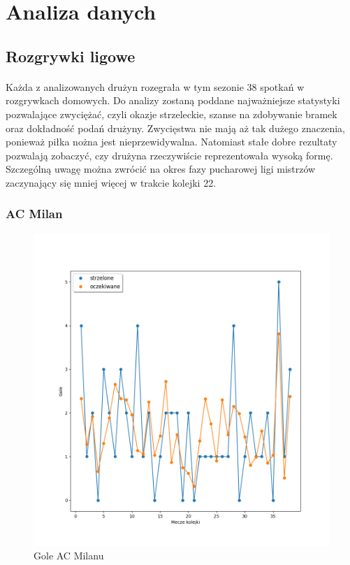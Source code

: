\documentclass[12pt, letterpaper]{article}
\begin{document}
\section{Analiza danych}
\subsection{Rozgrywki ligowe}
\paragraph{} Każda z analizowanych drużyn rozegrała w tym sezonie 38 spotkań w rozgrywkach domowych. Do analizy zostaną poddane najważniejsze statystyki pozwalające zwyciężać, czyli okazje strzeleckie, szanse na zdobywanie bramek oraz dokładność podań drużyny. Zwycięstwa nie mają aż tak dużego znaczenia, ponieważ piłka nożna jest nieprzewidywalna. Natomiast stałe dobre rezultaty pozwalają zobaczyć, czy drużyna rzeczywiście reprezentowała wysoką formę. Szczególną uwagę można zwrócić na okres fazy pucharowej ligi mistrzów zaczynający się mniej więcej w trakcie kolejki 22.

\subsubsection{AC Milan}
\begin{figure}[ht]
    \centering
    \includegraphics[width=.8\textwidth]{images/Milan_goals.png}
    \caption{Gole AC Milanu}
    \label{fig:enter-label}
\end{figure}
\end{document}
